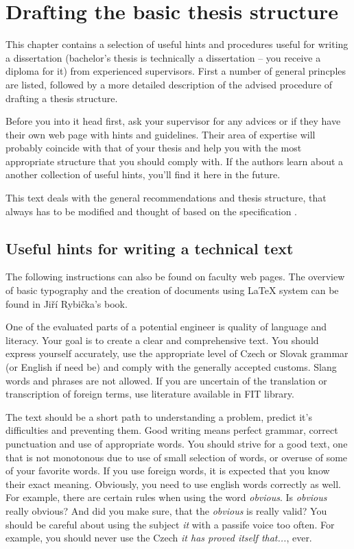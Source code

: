 \chapter{Drafting the basic thesis structure}
\label{struktura}

This chapter contains a selection of useful hints and procedures useful for writing a dissertation (bachelor's thesis is technically a dissertation -- you receive a diploma for it) from experienced supervisors. First a number of general princples are listed, followed by a more detailed description of the advised procedure of drafting a thesis structure.

Before you into it head first, ask your supervisor for any advices or if they have their own web page with hints and guidelines. Their area of expertise will probably coincide with that of your thesis and help you with the most appropriate structure that you should comply with. If the authors learn about a another collection of useful hints, you'll find it here in the future.

This text deals with the general recommendations and thesis structure, that always has to be modified and thought of based on the specification \cite{Cernocky}.


\section{Useful hints for writing a technical text}

The following instructions can also be found on faculty web pages\cite{fitWeb}. The overview of basic typography and the creation of documents using \LaTeX{} system can be found in Jiří Rybička's book\cite{Rybicka}.

One of the evaluated parts of a potential engineer is quality of language and literacy. Your goal is to create a clear and comprehensive text. You should express yourself accurately, use the appropriate level of Czech or Slovak grammar (or English if need be) and comply with the generally accepted customs. Slang words and phrases are not allowed. If you are uncertain of the translation or transcription of foreign terms, use literature available in FIT library.

The text should be a short path to understanding a problem, predict it's difficulties and preventing them. Good writing means perfect grammar, correct punctuation and use of appropriate words. You should strive for a good text, one that is not monotonous due to use of small selection of words, or overuse of some of your favorite words. If you use foreign words, it is expected that you know their exact meaning. Obviously, you need to use english words correctly as well. For example, there are certain rules when using the word {\it obvious}. Is {\it obvious} really obvious? And did you make sure, that the {\it obvious} is really valid? You should be careful about using the subject {\it it} with a passife voice too often. For example, you should never use the Czech {\it it has proved itself that...}, ever.

